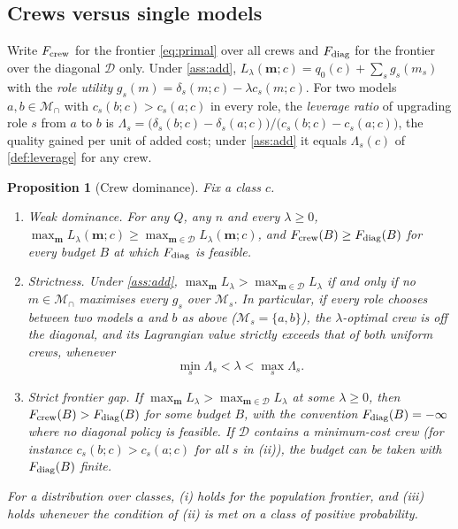 \documentclass[11pt,a4paper]{article}
\newtheorem{proposition}{Proposition}
\theoremstyle{definition}
\theoremstyle{remark}
\theoremstyle{definition}
\newcommand{\mods}{\mathcal{M}}
\newcommand{\crew}{\mathbf{m}}
\begin{document}
\subsection{Crews versus single models}
\label{sec:diagonal}

Write $F_{\rm crew}$ for the frontier \eqref{eq:primal} over all crews and $F_{\rm diag}$ for the frontier over the diagonal $\mathcal D$ only. Under \cref{ass:add}, $L_\lambda(\crew;c)=q_0(c)+\sum_s g_s(m_s)$ with the \emph{role utility} $g_s(m)=\delta_s(m;c)-\lambda c_s(m;c)$. For two models $a,b\in\mods_\cap$ with $c_s(b;c)>c_s(a;c)$ in every role, the \emph{leverage ratio} of upgrading role $s$ from $a$ to $b$ is $\Lambda_s=\big(\delta_s(b;c)-\delta_s(a;c)\big)/\big(c_s(b;c)-c_s(a;c)\big)$, the quality gained per unit of added cost; under \cref{ass:add} it equals $\Lambda_s(c)$ of \cref{def:leverage} for any crew.

\begin{proposition}[Crew dominance]
\label{prop:dominance}
Fix a class $c$.
\begin{enumerate}[label=(\roman*),leftmargin=*]
\item \emph{Weak dominance.} For any $Q$, any $n$ and every $\lambda\ge0$, $\max_{\crew}L_\lambda(\crew;c)\ge\max_{\crew\in\mathcal D}L_\lambda(\crew;c)$, and $F_{\rm crew}(B)\ge F_{\rm diag}(B)$ for every budget $B$ at which $F_{\rm diag}$ is feasible.
\item \emph{Strictness.} Under \cref{ass:add}, $\max_{\crew}L_\lambda>\max_{\crew\in\mathcal D}L_\lambda$ if and only if no $m\in\mods_\cap$ maximises every $g_s$ over $\mods_s$. In particular, if every role chooses between two models $a$ and $b$ as above ($\mods_s=\{a,b\}$), the $\lambda$-optimal crew is off the diagonal, and its Lagrangian value strictly exceeds that of both uniform crews, whenever
\[
\min_s\Lambda_s<\lambda<\max_s\Lambda_s .
\]
\item \emph{Strict frontier gap.} If $\max_{\crew}L_\lambda>\max_{\crew\in\mathcal D}L_\lambda$ at some $\lambda\ge0$, then $F_{\rm crew}(B)>F_{\rm diag}(B)$ for some budget $B$, with the convention $F_{\rm diag}(B)=-\infty$ where no diagonal policy is feasible. If $\mathcal D$ contains a minimum-cost crew (for instance $c_s(b;c)>c_s(a;c)$ for all $s$ in (ii)), the budget can be taken with $F_{\rm diag}(B)$ finite.
\end{enumerate}
For a distribution over classes, (i) holds for the population frontier, and (iii) holds whenever the condition of (ii) is met on a class of positive probability.
\end{proposition}
\end{document}
